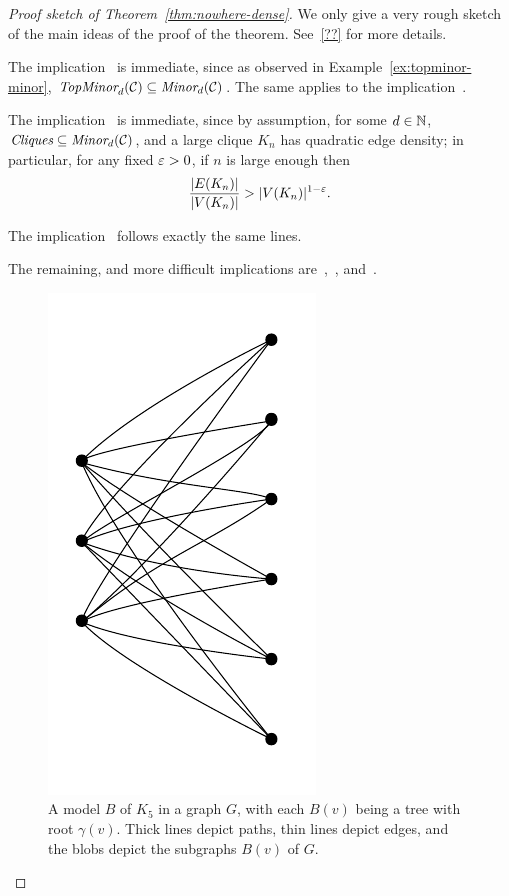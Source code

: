 \begin{proof}[Proof sketch of Theorem~\ref{thm:nowhere-dense}]
  We only give a very rough sketch of the main ideas of the proof of the theorem. See~\ref{??} for more details.
  
  The implication~
  is immediate, since as observed in Example~\ref{ex:topminor-minor}, $\textit{TopMinor}_{d}({\cal C})\subseteq\textit{Minor}_{d}({\cal C})$. The same applies to the implication~.
  
  The implication~
  is immediate, since by assumption, for some $d\in\mathbb{N}$,
  $\textit{Cliques}\subseteq\textit{Minor}_{d}({\cal C})$,
  and a large  clique $K_n$ has quadratic edge density; in particular, for any fixed $\varepsilon>0$, if $n$ is large enough then $$\frac{|E(K_n)|}{|V(K_n)|}>|V(K_n)|^{1-\varepsilon}.$$ 

The implication~
follows exactly the same lines.

  The remaining, and more difficult implications are~,~,
  and~.

  
  
	\begin{figure}[h]
	  \centering
	    \includegraphics[scale=0.25,page=11]{pictures.pdf}
	  \caption{A model $B$ of $K_5$ in a graph $G$,
    with each $B(v)$ being a tree with root $\gamma(v)$.
    Thick lines depict paths, thin lines depict edges,
    and the blobs depict the subgraphs $B(v)$ of $G$.
	  } 
	  \label{fig:model}
	\end{figure}	 

\end{proof}
